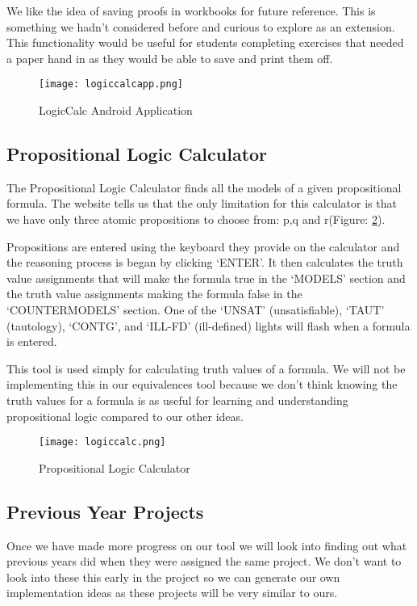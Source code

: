 \documentclass{report}
\begin{document}
We like the idea of saving proofs in workbooks for future reference. This is something we hadn't considered before and curious to explore as an extension. This functionality would be useful for students completing exercises that needed a paper hand in as they would be able to save and print them off.

\begin{figure}[ht]
    \centering
    \texttt{[image: logiccalcapp.png]}
    \caption{LogicCalc Android Application}
    \label{logiccalcapp}
\end{figure}

\subsection{Propositional Logic Calculator}

The Propositional Logic Calculator\cite{logiccalc} finds all the models of a given propositional formula. 
The website tells us that the only limitation for this calculator is that we have only three atomic propositions to choose from: p,q and r(Figure: \ref{logiccalc}).

Propositions are entered using the keyboard they provide on the calculator and the reasoning process is began by clicking `ENTER'. It then calculates the truth value assignments that will make the formula true in the `MODELS' section and the truth value assignments making the formula false in the `COUNTERMODELS' section. One of the `UNSAT' (unsatisfiable), `TAUT' (tautology), `CONTG', and `ILL-FD' (ill-defined) lights will flash when a formula is entered.

This tool is used simply for calculating truth values of a formula. We will not be implementing this in our equivalences tool because we don't think knowing the truth values for a formula is as useful for learning and understanding propositional logic compared to our other ideas.

\begin{figure}[ht]
    \centering
    \texttt{[image: logiccalc.png]}
    \caption{Propositional Logic Calculator}
    \label{logiccalc}
\end{figure}

\subsection{Previous Year Projects}

Once we have made more progress on our tool we will look into finding out what previous years did when they were assigned the same project. We don't want to look into these this early in the project so we can generate our own implementation ideas as these projects will be very similar to ours.
\end{document}
